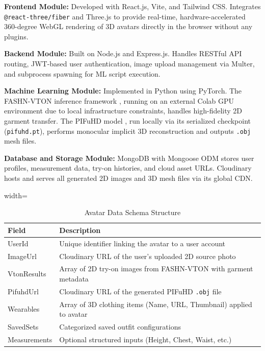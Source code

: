 \documentclass[conference]{IEEEtran}
\begin{document}
\textbf{Frontend Module:} Developed with React.js, Vite, and Tailwind CSS. Integrates \texttt{@react-three/fiber} and Three.js \cite{b8} to provide real-time, hardware-accelerated 360-degree WebGL rendering of 3D avatars directly in the browser without any plugins.

\textbf{Backend Module:} Built on Node.js and Express.js. Handles RESTful API routing, JWT-based user authentication, image upload management via Multer, and subprocess spawning for ML script execution.

\textbf{Machine Learning Module:} Implemented in Python using PyTorch. The FASHN-VTON inference framework \cite{b23}, running on an external Colab GPU environment due to local infrastructure constraints, handles high-fidelity 2D garment transfer. The PIFuHD model \cite{b1}, run locally via its serialized checkpoint (\texttt{pifuhd.pt}), performs monocular implicit 3D reconstruction and outputs \texttt{.obj} mesh files.

\textbf{Database and Storage Module:} MongoDB with Mongoose ODM stores user profiles, measurement data, try-on histories, and cloud asset URLs. Cloudinary hosts and serves all generated 2D images and 3D mesh files via its global CDN.

\begin{table}[htbp]
\centering
\caption{Avatar Data Schema Structure}
\begin{adjustbox}{width=\linewidth}
\begin{tabular}{|l|p{5.5cm}|}
\hline
\textbf{Field} & \textbf{Description} \\
\hline
UserId & Unique identifier linking the avatar to a user account \\
\hline
ImageUrl & Cloudinary URL of the user's uploaded 2D source photo \\
\hline
VtonResults & Array of 2D try-on images from FASHN-VTON \cite{b23} with garment metadata \\
\hline
PifuhdUrl & Cloudinary URL of the generated PIFuHD \texttt{.obj} file \cite{b1} \\
\hline
Wearables & Array of 3D clothing items (Name, URL, Thumbnail) applied to avatar \\
\hline
SavedSets & Categorized saved outfit configurations \\
\hline
Measurements & Optional structured inputs (Height, Chest, Waist, etc.) \\
\hline
\end{tabular}
\end{adjustbox}
\label{tab:schema}
\end{table}
\end{document}
